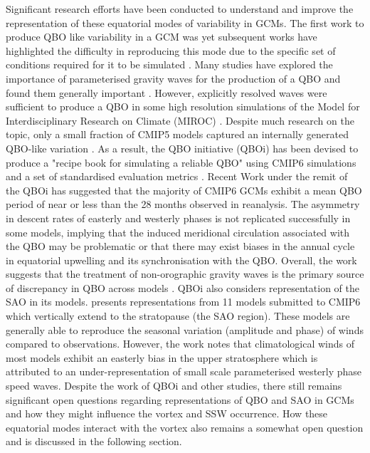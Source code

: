Significant research efforts have been conducted to understand and improve the representation of these equatorial modes of variability in GCMs. The first work to produce QBO like variability in a GCM was \cite{takahashiSimulation1996} yet subsequent works have highlighted the difficulty in reproducing this mode due to the specific set of conditions required for it to be simulated \citep{Baldwin2001}. Many studies have explored the importance of parameterised gravity waves for the production of a QBO and found them generally important \citep{giorgettaClimatology2006,ospreyClimatology2010b}. However, explicitly resolved waves were sufficient to produce a QBO in some high resolution simulations of the Model for Interdisciplinary Research on Climate (MIROC) \citep{kawataniQuasiBiennial2011}. Despite much research on the topic, only a small fraction of CMIP5 models captured an internally generated QBO-like variation \citep{charlton-perezLack2013}. As a result, the QBO initiative (QBOi) has been devised to produce a "recipe book for simulating a reliable QBO" using CMIP6 simulations and a set of standardised evaluation metrics \citep{butchartOverview2018}. Recent Work under the remit of the QBOi \citep{bushellEvaluation2020b} has suggested that the majority of CMIP6 GCMs exhibit a mean QBO period of near or less than the 28 months observed in reanalysis. The asymmetry in descent rates of easterly and westerly phases is not replicated successfully in some models, implying that the induced meridional circulation associated with the QBO may be problematic or that there may exist biases in the annual cycle in equatorial upwelling and its synchronisation with the QBO. Overall, the work suggests that the treatment of non-orographic gravity waves is the primary source of discrepancy in QBO across models \citep{bushellEvaluation2020b}. QBOi also considers representation of the SAO in its models. \cite{smithEquatorial2019} presents representations from 11 models submitted to CMIP6 which vertically extend to the stratopause (the SAO region). These models are generally able to reproduce the seasonal variation (amplitude and phase) of winds compared to observations. However, the work notes that climatological winds of most models exhibit an easterly bias in the upper stratosphere which is attributed to an under-representation of small scale parameterised westerly phase speed waves. Despite the work of QBOi and other studies, there still remains significant open questions regarding representations of QBO and SAO in GCMs and how they might influence the vortex and SSW occurrence. How these equatorial modes interact with the vortex also remains a somewhat open question and is discussed in the following section. 

